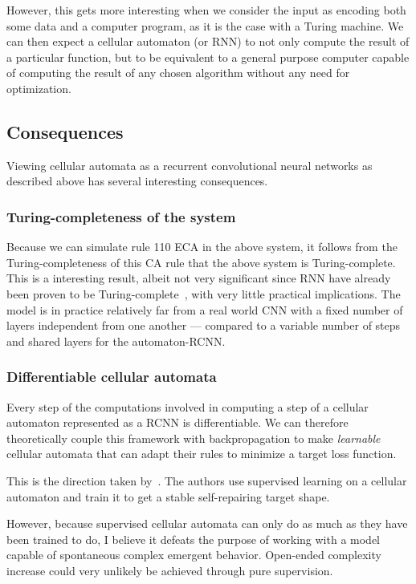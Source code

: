 However, this gets more interesting when we consider the input as encoding both
some data and a computer program, as it is the case with a Turing machine. We can
then expect a cellular automaton (or RNN) to not only compute the result of a particular
function, but to be equivalent to a general purpose computer capable of
computing the result of any chosen algorithm without any need for optimization.


\subsection{Consequences}

Viewing cellular automata as a recurrent convolutional neural networks  as
described above has several interesting consequences.

\subsubsection{Turing-completeness of the system}

Because we can simulate rule 110 ECA in the above system, it follows from the
Turing-completeness of this CA rule that the above system is Turing-complete.
This is a interesting result, albeit not very significant since RNN have already
been proven to be
Turing-complete~\parencite{siegelmannComputationalPowerNeural1992}, with very
little practical implications. The model is in practice relatively far from a
real world CNN with a fixed number of layers independent from one another ---
compared to a variable number of steps and shared layers for the
automaton-RCNN\@.

\subsubsection{Differentiable cellular automata}

Every step of the computations involved in computing a step of a cellular
automaton represented as a RCNN is differentiable. We can therefore
theoretically couple this framework with backpropagation to make
\emph{learnable} cellular automata that can adapt their rules to minimize a
target loss function.

This is the direction taken by~\textcite{mordvintsevGrowingNeuralCellular2020}.
The authors use supervised learning on a cellular automaton and train it to get
a stable self-repairing target shape.

However, because supervised cellular automata can only do as much as they have
been trained to do, I believe it defeats the purpose of working with a model
capable of spontaneous complex emergent behavior. Open-ended complexity increase
could very unlikely be achieved through pure supervision.

